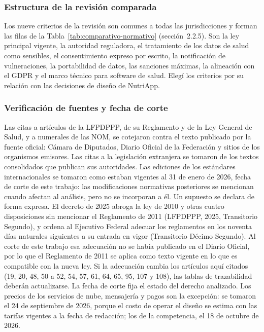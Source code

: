 \documentclass[12pt, a4paper]{article}
\begin{document}
\subsubsection{Estructura de la revisión comparada}
 
Los nueve criterios de la revisión son comunes a todas las
jurisdicciones y forman las filas de la Tabla~\ref{tab:comparativo-normativo}
(sección~2.2.5). Son la ley principal vigente, la autoridad reguladora,
el tratamiento de los datos de salud como sensibles, el consentimiento
expreso por escrito, la notificación de vulneraciones, la portabilidad de
datos, las sanciones máximas, la alineación con el GDPR y el marco
técnico para software de salud. Elegí los criterios por su relación con las decisiones de
diseño de NutriApp.
 
\subsubsection{Verificación de fuentes y fecha de corte}
 
Las citas a artículos de la LFPDPPP, de su Reglamento y de la Ley
General de Salud, y a numerales de las NOM, se cotejaron contra el
texto publicado por la fuente oficial: Cámara de Diputados, Diario
Oficial de la Federación y sitios de los organismos emisores. Las citas
a la legislación extranjera se tomaron de los textos consolidados que
publican sus autoridades. Las ediciones de los estándares
internacionales se tomaron como estaban vigentes al 31 de enero de
2026, fecha de corte de este trabajo: las modificaciones normativas
posteriores se mencionan cuando afectan al análisis, pero no se
incorporan a él. Un supuesto se declara de forma expresa. El decreto
de 2025 abroga la ley de 2010 y otras cuatro disposiciones sin
mencionar el Reglamento de 2011 (LFPDPPP, 2025, Transitorio Segundo),
y ordena al Ejecutivo Federal adecuar los reglamentos en los noventa
días naturales siguientes a su entrada en vigor (Transitorio Décimo
Segundo). Al corte de este trabajo esa adecuación no se había
publicado en el Diario Oficial, por lo que el Reglamento de 2011 se
aplica como texto vigente en lo que es compatible con la nueva ley.
Si la adecuación cambia los artículos aquí citados
(19, 20, 48, 50 a 52, 54, 57, 61, 64, 65, 95, 107 y 108), las tablas de trazabilidad
deberán actualizarse. La fecha de corte fija el estado del derecho
analizado. Los precios de los servicios de nube, mensajería y pagos
son la excepción: se tomaron el 24 de septiembre de 2026, porque el
costo de operar el diseño se estima con las tarifas vigentes a la
fecha de redacción; los de la competencia, el 18 de octubre de 2026.
 
\end{document}
